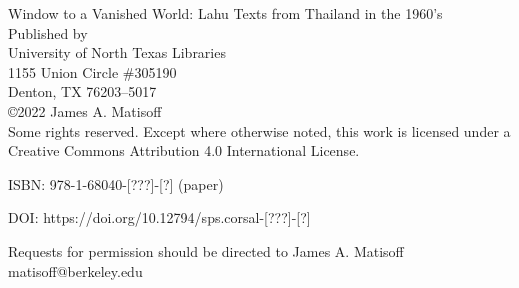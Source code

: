 \thispagestyle{empty}
\begin{center}
\vspace*{\fill}
Window to a Vanished World: Lahu Texts from Thailand in the 1960’s \\
\vspace{10em}
Published by \\
University of North Texas Libraries \\
1155 Union Circle \#305190 \\
Denton, TX  76203–5017 \\
\vspace{10em}
\copyright 2022 James A. Matisoff \\
Some rights reserved. Except where otherwise noted, this work is licensed under a Creative Commons Attribution 4.0 International License.

ISBN: 978-1-68040-[???]-[?] (paper)

DOI: https://doi.org/10.12794/sps.corsal-[???]-[?]


Requests for permission should be directed to James A. Matisoff matisoff@berkeley.edu

\vspace{10em}
\date{Compiled on \today\ at \currenttime}
\end{center}